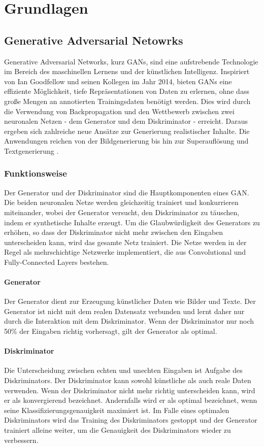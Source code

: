 \chapter{Grundlagen}

\section{Generative Adversarial Netowrks}
Generative Adversarial Networks, kurz GANs, sind eine aufstrebende Technologie im Bereich des maschinellen Lernens und der künstlichen Intelligenz. Inspiriert von Ian Goodfellow und seinen Kollegen im Jahr 2014, bieten GANs eine effiziente Möglichkeit, tiefe Repräsentationen von Daten zu erlernen, ohne dass große Mengen an annotierten Trainingsdaten benötigt werden\cite{Creswell.2018}. 
Dies wird durch die Verwendung von Backpropagation und den Wettbewerb zwischen zwei neuronalen Netzen - dem Generator und dem Diskriminator - erreicht. 
Daraus ergeben sich zahlreiche neue Ansätze zur Generierung realistischer Inhalte. 
Die Anwendungen reichen von der Bildgenerierung bis hin zur Superauflösung und Textgenerierung \cite{Aggarwal.2021}.

\subsection*{Funktionsweise}
Der Generator und der Diskriminator sind die Hauptkomponenten eines GAN. Die beiden neuronalen Netze werden gleichzeitig trainiert und konkurrieren miteinander, wobei der Generator versucht, den Diskriminator zu täuschen, indem er synthetische Inhalte erzeugt. Um die Glaubwürdigkeit des Generators zu erhöhen, so dass der Diskriminator nicht mehr zwischen den Eingaben unterscheiden kann, wird das gesamte Netz trainiert. Die Netze werden in der Regel als mehrschichtige Netzwerke implementiert, die aus Convolutional und Fully-Connected Layers bestehen\cite{Creswell.2018}.

\subsubsection*{Generator}
Der Generator dient zur Erzeugung künstlicher Daten wie Bilder und Texte. 
Der Generator ist nicht mit dem realen Datensatz verbunden und lernt daher nur durch die Interaktion mit dem Diskriminator. Wenn der Diskriminator nur noch 50\% der Eingaben richtig vorhersagt, gilt der Generator als optimal\cite{Creswell.2018}.

\subsubsection*{Diskriminator}
Die Unterscheidung zwischen echten und unechten Eingaben ist Aufgabe des Diskriminators. Der Diskriminator kann sowohl künstliche als auch reale Daten verwenden. 
Wenn der Diskriminator nicht mehr richtig unterscheiden kann, wird er als konvergierend bezeichnet\cite{Aggarwal.2021}. Andernfalls wird er als optimal bezeichnet, wenn seine Klassifizierungsgenauigkeit maximiert ist. Im Falle eines optimalen Diskriminators wird das Training des Diskriminators gestoppt und der Generator trainiert alleine weiter, um die Genauigkeit des Diskriminators wieder zu verbessern\cite{Creswell.2018}.

